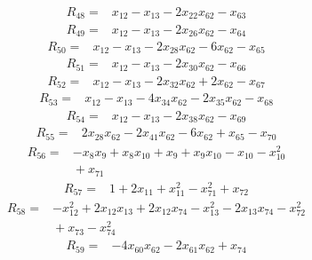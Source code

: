 {\begin{align*}
R_{48} ={}& x_{12} - x_{13} - 2x_{22} x_{62} - x_{63}
\end{align*}
\begin{align*}
R_{49} ={}& x_{12} - x_{13} - 2x_{26} x_{62} - x_{64}
\end{align*}
\begin{align*}
R_{50} ={}& x_{12} - x_{13} - 2x_{28} x_{62} - 6x_{62} - x_{65}
\end{align*}
\begin{align*}
R_{51} ={}& x_{12} - x_{13} - 2x_{30} x_{62} - x_{66}
\end{align*}
\begin{align*}
R_{52} ={}& x_{12} - x_{13} - 2x_{32} x_{62} + 2x_{62} - x_{67}
\end{align*}
\begin{align*}
R_{53} ={}& x_{12} - x_{13} - 4x_{34} x_{62} - 2x_{35} x_{62} - x_{68}
\end{align*}
\begin{align*}
R_{54} ={}& x_{12} - x_{13} - 2x_{38} x_{62} - x_{69}
\end{align*}
\begin{align*}
R_{55} ={}& 2x_{28} x_{62} - 2x_{41} x_{62} - 6x_{62} + x_{65} - x_{70}
\end{align*}
\begin{align*}
R_{56} ={}& -x_{8} x_{9} + x_{8} x_{10} + x_{9} + x_{9} x_{10} - x_{10} - x_{10}^{2} \\
&{}  + x_{71}
\end{align*}
\begin{align*}
R_{57} ={}& 1 + 2x_{11} + x_{11}^{2} - x_{71}^{2} + x_{72}
\end{align*}
\begin{align*}
R_{58} ={}& -x_{12}^{2} + 2x_{12} x_{13} + 2x_{12} x_{74} - x_{13}^{2} - 2x_{13} x_{74} - x_{72}^{2} \\
&{}  + x_{73} - x_{74}^{2}
\end{align*}
\begin{align*}
R_{59} ={}& -4x_{60} x_{62} - 2x_{61} x_{62} + x_{74}
\end{align*}
}
